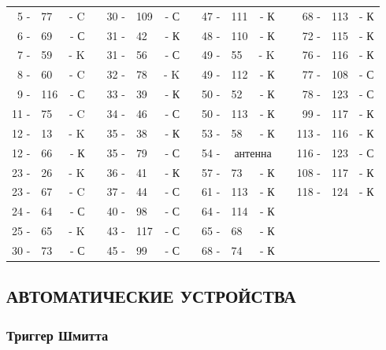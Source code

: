 \documentclass[12pt]{article}
\newcommand{\mc}{\multicolumn}
\begin{document}
\begin{tabular}{r l r p{0.5cm} r l r p{0.5cm} r l r p{0.5cm} r l r}
 5 - & 77  & - C &     & 30 - & 109 & - С &      &  47 - & 111 & - К          &     &  68 - & 113 & - К\\
 6 - & 69  & - С &     & 31 - &  42 & - К &      &  48 - & 110 & - К          &     &  72 - & 115 & - К\\
 7 - & 59  & - K &     & 31 - &  56 & - С &      &  49 - &  55 & - K          &     &  76 - & 116 & - К\\
 8 - & 60  & - C &     & 32 - &  78 & - K &      &  49 - & 112 & - К          &     &  77 - & 108 & - С\\
 9 - & 116 & - С &     & 33 - &  39 & - К &      &  50 - &  52 & - К          &     &  78 - & 123 & - С\\
11 - & 75  & - C &     & 34 - &  46 & - С &      &  50 - & 113 & - К          &     &  99 - & 117 & - К\\
12 - & 13  & - K &     & 35 - &  38 & - К &      &  53 - &  58 & - К          &     & 113 - & 116 & - К\\
12 - & 66  & - К &     & 35 - &  79 & - С &      &  54 - & \mc{2}{c}{антенна} &     & 116 - & 123 & - С\\
23 - & 26  & - K &     & 36 - &  41 & - К &      &  57 - &  73 & - К          &     & 108 - & 117 & - К\\
23 - & 67  & - C &     & 37 - &  44 & - С &      &  61 - & 113 & - К          &     & 118 - & 124 & - К\\
24 - & 64  & - С &     & 40 - &  98 & - С &      &  64 - & 114 & - К          &     &       &     &   \\
25 - & 65  & - K &     & 43 - & 117 & - С &      &  65 - &  68 & - К          &     &       &     &   \\
30 - & 73  & - С &     & 45 - &  99 & - С &      &  68 - &  74 & - К          &     &       &     &   \\
\end{tabular}

\hrulefill

\subsection{АВТОМАТИЧЕСКИЕ УСТРОЙСТВА}

\subsubsection{Триггер Шмитта}
\end{document}
